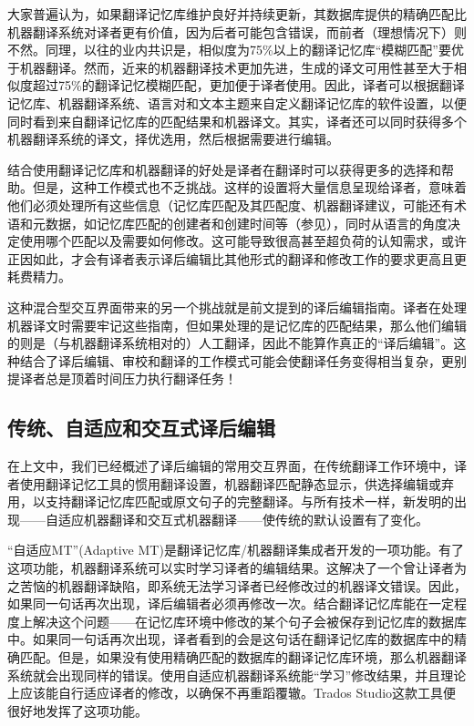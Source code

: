 \documentclass[output=paper,colorlinks,citecolor=brown]{langscibook}
\begin{document}
大家普遍认为，如果翻译记忆库维护良好并持续更新，其数据库提供的精确匹配比机器翻译系统对译者更有价值，因为后者可能包含错误，而前者（理想情况下）则不然。同理，以往的业内共识是，相似度为75\%以上的翻译记忆库“模糊匹配”要优于机器翻译。然而，近来的机器翻译技术更加先进，生成的译文可用性甚至大于相似度超过75\%的翻译记忆模糊匹配，更加便于译者使用。因此，译者可以根据翻译记忆库、机器翻译系统、语言对和文本主题来自定义翻译记忆库的软件设置，以便同时看到来自翻译记忆库的匹配结果和机器译文。其实，译者还可以同时获得多个机器翻译系统的译文，择优选用，然后根据需要进行编辑。

结合使用翻译记忆库和机器翻译的好处是译者在翻译时可以获得更多的选择和帮助。但是，这种工作模式也不乏挑战。这样的设置将大量信息呈现给译者，意味着他们必须处理所有这些信息（记忆库匹配及其匹配度、机器翻译建议，可能还有术语和元数据，如记忆库匹配的创建者和创建时间等（参见\citealt{TeixeiraOBrien2017}），同时从语言的角度决定使用哪个匹配以及需要如何修改。这可能导致很高甚至超负荷的认知需求，或许正因如此，才会有译者表示译后编辑比其他形式的翻译和修改工作的要求更高且更耗费精力。

这种混合型交互界面带来的另一个挑战就是前文提到的译后编辑指南。译者在处理机器译文时需要牢记这些指南，但如果处理的是记忆库的匹配结果，那么他们编辑的则是（与机器翻译系统相对的）人工翻译，因此不能算作真正的“译后编辑”。这种结合了译后编辑、审校和翻译的工作模式可能会使翻译任务变得相当复杂，更别提译者总是顶着时间压力执行翻译任务！

\subsection{传统、自适应和交互式译后编辑}\label{sec:obrien:3.1}

在上文中，我们已经概述了译后编辑的常用交互界面，在传统翻译工作环境中，译者使用翻译记忆工具的惯用翻译设置，机器翻译匹配静态显示，供选择编辑或弃用，以支持翻译记忆库匹配或原文句子的完整翻译。与所有技术一样，新发明的出现——自适应机器翻译和交互式机器翻译——使传统的默认设置有了变化。

“自适应MT”(Adaptive MT)是翻译记忆库/机器翻译集成者开发的一项功能。有了这项功能，机器翻译系统可以实时学习译者的编辑结果。这解决了一个曾让译者为之苦恼的机器翻译缺陷，即系统无法学习译者已经修改过的机器译文错误。因此，如果同一句话再次出现，译后编辑者必须再修改一次。结合翻译记忆库能在一定程度上解决这个问题——在记忆库环境中修改的某个句子会被保存到记忆库的数据库中。如果同一句话再次出现，译者看到的会是这句话在翻译记忆库的数据库中的精确匹配。但是，如果没有使用精确匹配的数据库的翻译记忆库环境，那么机器翻译系统就会出现同样的错误。使用自适应机器翻译系统能“学习”修改结果，并且理论上应该能自行适应译者的修改，以确保不再重蹈覆辙。Trados Studio这款工具便很好地发挥了这项功能。
\end{document}
